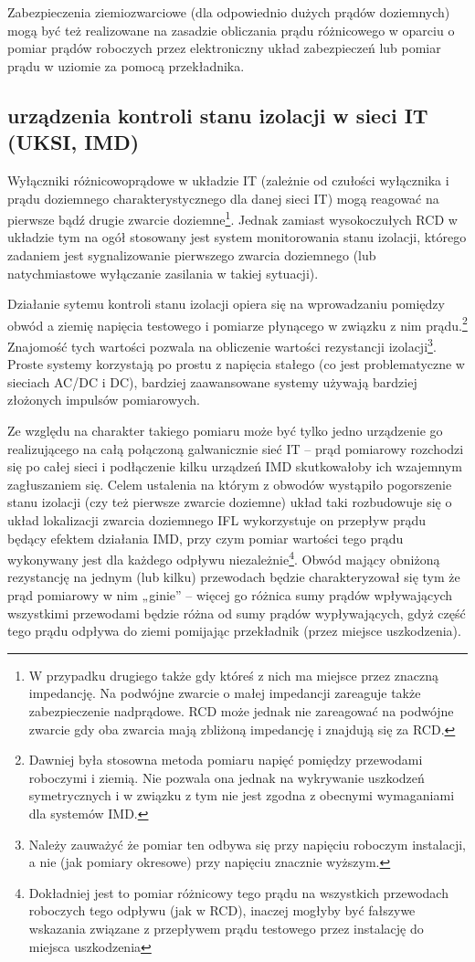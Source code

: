 Zabezpieczenia ziemiozwarciowe (dla odpowiednio dużych prądów doziemnych) mogą być też realizowane na zasadzie obliczania prądu różnicowego w oparciu o pomiar prądów roboczych przez elektroniczny układ zabezpieczeń lub pomiar prądu w uziomie za pomocą przekładnika. %

\subsection{urządzenia kontroli stanu izolacji w sieci IT (UKSI, IMD)}

Wyłączniki różnicowoprądowe w układzie IT (zależnie od czułości wyłącznika i prądu doziemnego charakterystycznego dla danej sieci IT) mogą reagować na pierwsze bądź drugie zwarcie doziemne\footnote{
	W przypadku drugiego także gdy któreś z nich ma miejsce przez znaczną impedancję. Na podwójne zwarcie o małej impedancji zareaguje także zabezpieczenie nadprądowe.
	RCD może jednak nie zareagować na podwójne zwarcie gdy oba zwarcia mają zbliżoną impedancję i znajdują się za RCD.
}.
Jednak zamiast wysokoczułych RCD w układzie tym na ogół stosowany jest system monitorowania stanu izolacji, którego zadaniem jest sygnalizowanie pierwszego zwarcia doziemnego (lub natychmiastowe wyłączanie zasilania w takiej sytuacji).

Działanie sytemu kontroli stanu izolacji opiera się na wprowadzaniu pomiędzy obwód a ziemię napięcia testowego i pomiarze płynącego w związku z nim prądu.\footnote{
	Dawniej była stosowna metoda pomiaru napięć pomiędzy przewodami roboczymi i ziemią. Nie pozwala ona jednak na wykrywanie uszkodzeń symetrycznych i w związku z tym nie jest zgodna z obecnymi wymaganiami dla systemów IMD.
}
Znajomość tych wartości pozwala na obliczenie wartości rezystancji izolacji\footnote{
	Należy zauważyć że pomiar ten odbywa się przy napięciu roboczym instalacji, a nie (jak pomiary okresowe) przy napięciu znacznie wyższym.
}.
Proste systemy korzystają po prostu z napięcia stałego (co jest problematyczne w sieciach AC/DC i DC), bardziej zaawansowane systemy używają bardziej złożonych impulsów pomiarowych.

Ze względu na charakter takiego pomiaru może być tylko jedno urządzenie go realizującego na całą połączoną galwanicznie sieć IT
	– prąd pomiarowy rozchodzi się po całej sieci i podłączenie kilku urządzeń IMD skutkowałoby ich wzajemnym zagłuszaniem się.
Celem ustalenia na którym z obwodów wystąpiło pogorszenie stanu izolacji (czy też pierwsze zwarcie doziemne) układ taki rozbudowuje się o układ lokalizacji zwarcia doziemnego IFL
	wykorzystuje on przepływ prądu będący efektem działania IMD, przy czym pomiar wartości tego prądu wykonywany jest dla każdego odpływu niezależnie\footnote{
		Dokładniej jest to pomiar różnicowy tego prądu na wszystkich przewodach roboczych tego odpływu (jak w RCD), inaczej mogłyby być fałszywe wskazania związane z przepływem prądu testowego przez instalację do miejsca uszkodzenia
	}.
Obwód mający obniżoną rezystancję na jednym (lub kilku) przewodach będzie charakteryzował się tym że prąd pomiarowy w nim „ginie”
	– więcej go różnica sumy prądów wpływających wszystkimi przewodami będzie różna od sumy prądów wypływających, gdyż część tego prądu odpływa do ziemi pomijając przekładnik (przez miejsce uszkodzenia).

